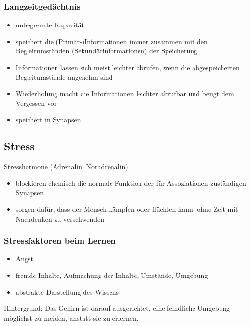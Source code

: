\subsubsection{Langzeitgedächtnis}
\begin{itemize}
    \item unbegrenzte Kapazität
    \item speichert die (Primär-)Informationen immer zusammen mit den Begleitumständen (Sekundärinformationen) der Speicherung
    \item Informationen lassen sich meist leichter abrufen, wenn die abgespeicherten Begleitumstände angenehm sind
    \item Wiederholung macht die Informationen leichter abrufbar und beugt dem Vergessen vor
    \item speichert in Synapsen
\end{itemize}

\subsection{Stress}
Stresshormone (Adrenalin, Noradrenalin)
\begin{itemize}
    \item blockieren chemisch die normale Funktion der für Assoziationen zuständigen Synapsen
    \item sorgen dafür, dass der Mensch kämpfen oder flüchten kann, ohne Zeit mit Nachdenken zu verschwenden
\end{itemize}

\subsubsection{Stressfaktoren beim Lernen}
\begin{itemize}
    \item Angst
    \item fremde Inhalte, Aufmachung der Inhalte, Umstände, Umgebung
    \item abstrakte Darstellung des Wissens
\end{itemize}

Hintergrund: Das Gehirn ist darauf ausgerichtet, eine feindliche Umgebung möglichst zu meiden, anstatt sie zu erlernen.
